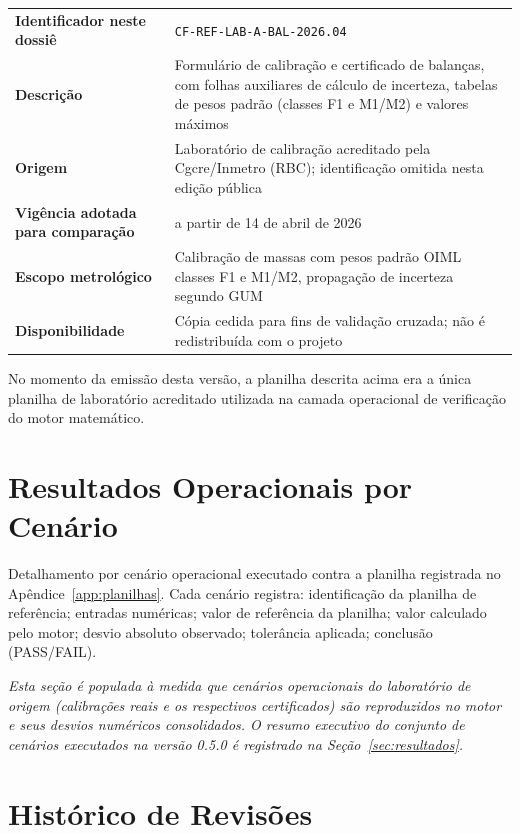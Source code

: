 \documentclass[11pt,a4paper]{article}
\newcommand{\docVersion}{0.5.0}
\begin{document}
\begin{tabularx}{\textwidth}{l X}
  \toprule
  \textbf{Identificador neste dossiê} & \texttt{CF-REF-LAB-A-BAL-2026.04} \\
  \textbf{Descrição} & Formulário de calibração e certificado de balanças, com folhas auxiliares de cálculo de incerteza, tabelas de pesos padrão (classes F1 e M1/M2) e valores máximos \\
  \textbf{Origem} & Laboratório de calibração acreditado pela Cgcre/Inmetro (RBC); identificação omitida nesta edição pública \\
  \textbf{Vigência adotada para comparação} & a partir de 14 de abril de 2026 \\
  \textbf{Escopo metrológico} & Calibração de massas com pesos padrão OIML classes F1 e M1/M2, propagação de incerteza segundo GUM \\
  \textbf{Disponibilidade} & Cópia cedida para fins de validação cruzada; não é redistribuída com o projeto \\
  \bottomrule
\end{tabularx}

\vspace{0.3cm}
No momento da emissão desta versão, a planilha descrita acima era a única planilha de laboratório acreditado utilizada na camada operacional de verificação do motor matemático.

\section{Resultados Operacionais por Cenário}
\label{app:planilhas-resultados}

Detalhamento por cenário operacional executado contra a planilha registrada no Apêndice~\ref{app:planilhas}. Cada cenário registra: identificação da planilha de referência; entradas numéricas; valor de referência da planilha; valor calculado pelo motor; desvio absoluto observado; tolerância aplicada; conclusão (\textsf{PASS}/\textsf{FAIL}).

\vspace{0.3cm}
\textit{Esta seção é populada à medida que cenários operacionais do laboratório de origem (calibrações reais e os respectivos certificados) são reproduzidos no motor e seus desvios numéricos consolidados. O resumo executivo do conjunto de cenários executados na versão \docVersion{} é registrado na Seção~\ref{sec:resultados}.}

\section{Histórico de Revisões}
\end{document}

